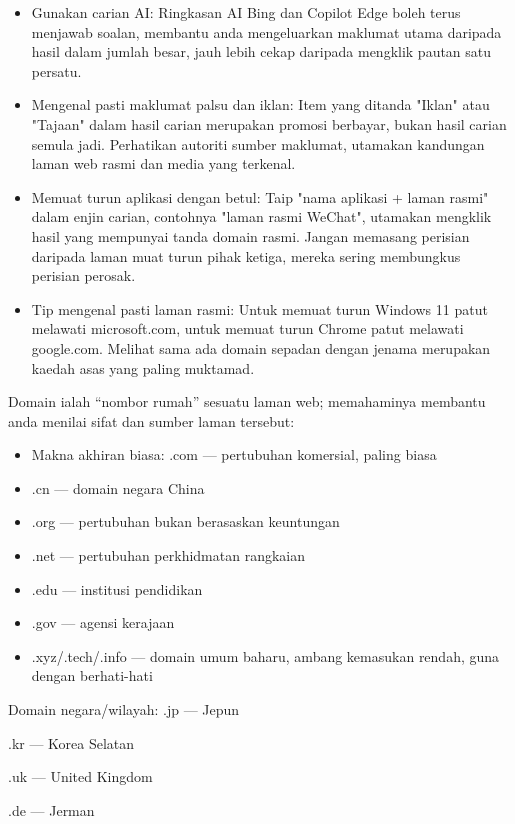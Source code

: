 \begin{itemize}
  \item Gunakan carian AI: Ringkasan AI Bing dan Copilot Edge boleh terus menjawab soalan, membantu anda mengeluarkan maklumat utama daripada hasil dalam jumlah besar, jauh lebih cekap daripada mengklik pautan satu persatu.
  \item Mengenal pasti maklumat palsu dan iklan: Item yang ditanda "Iklan" atau "Tajaan" dalam hasil carian merupakan promosi berbayar, bukan hasil carian semula jadi. Perhatikan autoriti sumber maklumat, utamakan kandungan laman web rasmi dan media yang terkenal.
  \item Memuat turun aplikasi dengan betul: Taip "nama aplikasi + laman rasmi" dalam enjin carian, contohnya "laman rasmi WeChat", utamakan mengklik hasil yang mempunyai tanda domain rasmi. Jangan memasang perisian daripada laman muat turun pihak ketiga, mereka sering membungkus perisian perosak.
  \item Tip mengenal pasti laman rasmi: Untuk memuat turun Windows 11 patut melawati microsoft.com, untuk memuat turun Chrome patut melawati google.com. Melihat sama ada domain sepadan dengan jenama merupakan kaedah asas yang paling muktamad.
\end{itemize}


Domain ialah “nombor rumah” sesuatu laman web; memahaminya membantu anda menilai sifat dan sumber laman tersebut:

\begin{itemize}
  \item Makna akhiran biasa: .com — pertubuhan komersial, paling biasa
  \item .cn — domain negara China
  \item .org — pertubuhan bukan berasaskan keuntungan
  \item .net — pertubuhan perkhidmatan rangkaian
  \item .edu — institusi pendidikan
  \item .gov — agensi kerajaan
  \item .xyz/.tech/.info — domain umum baharu, ambang kemasukan rendah, guna dengan berhati-hati
\end{itemize}

Domain negara/wilayah: .jp — Jepun

.kr — Korea Selatan

.uk — United Kingdom

.de — Jerman

